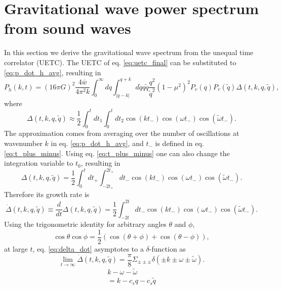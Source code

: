 \section{Gravitational wave power spectrum from sound waves}
\label{gw_from_sound_waves}
In this section we derive the gravitational wave spectrum from the unequal time correlator (UETC).
The UETC of eq. \eqref{eq:uetc_final} can be substituted to \eqref{eq:p_dot_h_avg},
resulting in
\cite[eq. 3.35]{hindmarsh_gw_pt_2019}
\begin{equation}
P_{\dot{h}} (k,t) = (16 \pi G)^2 \frac{4 \bar{w}}{4\pi^2 k}
\int_0^\infty dq \int_{|q-k|}^{q+k} d\tilde{q} q \tilde{q} \frac{q^2}{\tilde{q}^2} (1-\mu^2)^2
P_v(q) P_v(\tilde{q}) \Delta(t,k,q,\tilde{q}),
\end{equation}
where
\begin{equation}
\Delta(t,k,q,\tilde{q}) \approx \frac{1}{2} \int_0^t dt_1 \int_0^t dt_2 \cos(kt_-)\cos(\omega t_-)\cos(\tilde{\omega}t_-).
\end{equation}
The approximation comes from averaging over the number of oscillations at wavenumber $k$ in eq. \eqref{eq:p_dot_h_avg},
and $t_-$ is defined in eq. \eqref{eq:t_plus_minus}.
Using eq. \eqref{eq:t_plus_minus} one can also change the integration variable to $t_0$, resulting in
\begin{equation}
\Delta(t,k,q,\tilde{q}) = \frac{1}{2} \int_0^t dt_+ \int_{-2t_+}^{2t_+} dt_- \cos(kt_-) \cos(\omega t_-) \cos(\tilde{\omega} t_-).
\end{equation}
Therefore its growth rate is
\begin{equation}
\dot{\Delta}(t,k,q,\tilde{q}) \equiv \frac{d}{dt} \Delta(t,k,q,\tilde{q}) = \frac{1}{2} \int_{-2t}^{2t} dt_- \cos(kt_-) \cos(\omega t_-) \cos(\tilde{\omega} t_-).
\label{eq:delta_dot}
\end{equation}
Using the trigonometric identity for arbitrary angles $\theta$ and $\phi$,
\begin{equation}
\cos \theta \cos \phi = \frac{1}{2} \left( \cos(\theta + \phi) + \cos(\theta - \phi) \right),
\end{equation}
at large $t$, eq. \eqref{eq:delta_dot} asymptotes to a $\delta$-function as
\begin{equation}
\lim_{t\rightarrow\infty} \dot{\Delta}(t,k,q,\tilde{q}) = \frac{\pi}{8} \Sigma_{\pm\pm\pm} \delta(\pm k \pm \omega \pm \tilde{\omega}).
\end{equation}
\iffalse
\begin{align}
k - \omega - \tilde{\omega} \\
= k - c_s q - c_s \tilde{q} \\
\end{align}
